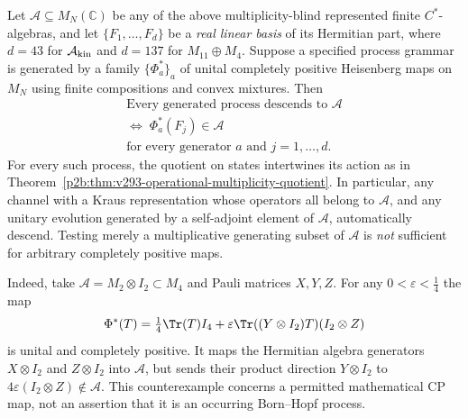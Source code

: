 \documentclass[12pt,a4paper]{article}
\begin{document}
\begin{proposition}
\label{p2c:prop:v294-finite-process-descent}
Let $\mathcal A\subseteq M_N(\mathbb C)$ be any of the above
multiplicity-blind represented finite $C^*$-algebras, and let
$\{F_1,\ldots,F_d\}$ be a \emph{real linear basis} of its Hermitian
part, where $d=43$ for $\mathcal A_{\rm kin}$ and $d=137$ for
$M_{11}\oplus M_4$. Suppose a specified process grammar is generated
by a family $\{\Phi^*_a\}_a$ of unital completely positive Heisenberg
maps on $M_N$ using finite compositions and convex mixtures. Then
\[
 \boxed{\begin{gathered}
 \text{Every generated process descends to }\mathcal A\\
 \iff\;\Phi^*_a(F_j)\in\mathcal A\\
 \text{for every generator }a\text{ and }j=1,\ldots,d.
 \end{gathered}}
\]
For every such process, the quotient on states intertwines its action
as in Theorem~\ref{p2b:thm:v293-operational-multiplicity-quotient}.
In particular, any channel with a Kraus representation whose operators
all belong to $\mathcal A$, and any unitary evolution generated by a
self-adjoint element of $\mathcal A$, automatically descend.
Testing merely a multiplicative generating subset of $\mathcal A$ is
\emph{not} sufficient for arbitrary completely positive maps.

Indeed, take $\mathcal A=M_2\otimes I_2\subset M_4$ and Pauli matrices
$X,Y,Z$. For any $0<\varepsilon<\tfrac14$ the map
\[
 \Phi^*(T)=\tfrac14\Tr(T)I_4
 +\varepsilon\Tr((Y\otimes I_2)T)(I_2\otimes Z)
\]
is unital and completely positive. It maps the Hermitian algebra
generators $X\otimes I_2$ and $Z\otimes I_2$ into $\mathcal A$,
but sends their product direction $Y\otimes I_2$ to
$4\varepsilon(I_2\otimes Z)\notin\mathcal A$.
This counterexample concerns a permitted mathematical CP map, not an
assertion that it is an occurring Born--Hopf process.
\end{proposition}
\end{document}
